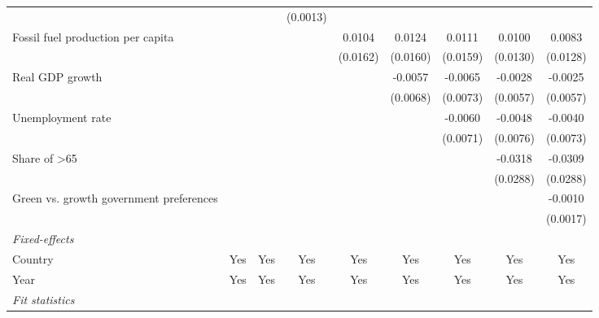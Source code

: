 \begin{table}[htbp]
\begin{tabular}{lcccccccc}
                                              &                &               & (0.0013) &          &          &          &          &   \\   
      Fossil fuel production per capita       &                &               &          & 0.0104   & 0.0124   & 0.0111   & 0.0100   & 0.0083\\   
                                              &                &               &          & (0.0162) & (0.0160) & (0.0159) & (0.0130) & (0.0128)\\   
      Real GDP growth                         &                &               &          &          & -0.0057  & -0.0065  & -0.0028  & -0.0025\\   
                                              &                &               &          &          & (0.0068) & (0.0073) & (0.0057) & (0.0057)\\   
      Unemployment rate                       &                &               &          &          &          & -0.0060  & -0.0048  & -0.0040\\   
                                              &                &               &          &          &          & (0.0071) & (0.0076) & (0.0073)\\   
      Share of >65                            &                &               &          &          &          &          & -0.0318  & -0.0309\\   
                                              &                &               &          &          &          &          & (0.0288) & (0.0288)\\   
      Green vs. growth government preferences &                &               &          &          &          &          &          & -0.0010\\   
                                              &                &               &          &          &          &          &          & (0.0017)\\   
      \midrule
      \emph{Fixed-effects}\\
      Country                                 & Yes            & Yes           & Yes      & Yes      & Yes      & Yes      & Yes      & Yes\\  
      Year                                    & Yes            & Yes           & Yes      & Yes      & Yes      & Yes      & Yes      & Yes\\  
      \midrule
      \emph{Fit statistics}\\

\end{tabular}
\end{table}
